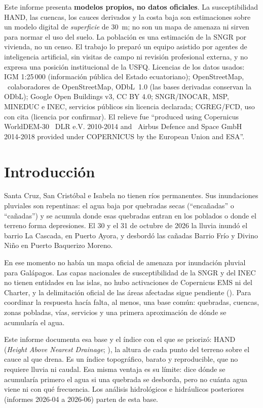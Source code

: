 \documentclass{sosg-informe}
\begin{document}
\begin{aviso}
Este informe presenta \textbf{modelos propios, no datos oficiales}. La susceptibilidad HAND, las cuencas, los cauces derivados y la costa baja son estimaciones sobre un modelo digital de \emph{superficie} de 30~m; no son un mapa de amenaza ni sirven para normar el uso del suelo. La población es una estimación de la SNGR por vivienda, no un censo. El trabajo lo preparó un equipo asistido por agentes de inteligencia artificial, sin visitas de campo ni revisión profesional externa, y no expresa una posición institucional de la USFQ. Licencias de los datos usados: IGM 1:25\,000 (información pública del Estado ecuatoriano); OpenStreetMap, \textcopyright\ colaboradores de OpenStreetMap, ODbL~1.0 (las bases derivadas conservan la ODbL); Google Open Buildings v3, CC BY 4.0; SNGR/INOCAR, MSP, MINEDUC e INEC, servicios públicos sin licencia declarada; CGREG/FCD, uso con cita (licencia por confirmar). El relieve fue \enquote{produced using Copernicus WorldDEM-30 \textcopyright\ DLR e.V. 2010-2014 and \textcopyright\ Airbus Defence and Space GmbH 2014-2018 provided under COPERNICUS by the European Union and ESA}.
\end{aviso}

\section{Introducción}

Santa Cruz, San Cristóbal e Isabela no tienen ríos permanentes. Sus inundaciones pluviales son repentinas: el agua baja por quebradas secas (\enquote{encañadas} o \enquote{cañadas}) y se acumula donde esas quebradas entran en los poblados o donde el terreno forma depresiones. El 30 y el 31 de octubre de 2026 la lluvia inundó el barrio La Cascada, en Puerto Ayora, y desbordó las cañadas Barrio Frío y Divino Niño en Puerto Baquerizo Moreno.

En ese momento no había un mapa oficial de amenaza por inundación pluvial para Galápagos. Las capas nacionales de susceptibilidad de la SNGR y del INEC no tienen entidades en las islas, no hubo activaciones de Copernicus EMS ni del Charter, y la delimitación oficial de las áreas afectadas sigue pendiente (). Para coordinar la respuesta hacía falta, al menos, una base común: quebradas, cuencas, zonas pobladas, vías, servicios y una primera aproximación de dónde se acumularía el agua.

Este informe documenta esa base y el índice con el que se priorizó: HAND (\emph{Height Above Nearest Drainage}; \citealp{renno2008,nobre2011}), la altura de cada punto del terreno sobre el cauce al que drena. Es un índice topográfico, barato y reproducible, que no requiere lluvia ni caudal. Esa misma ventaja es su límite: dice dónde se acumularía primero el agua si una quebrada se desborda, pero no cuánta agua viene ni con qué frecuencia. Los análisis hidrológicos e hidráulicos posteriores (informes 2026-04 a 2026-06) parten de esta base.
\end{document}
